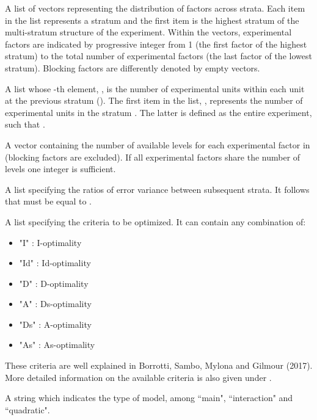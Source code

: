 \documentclass[a4paper]{book}
\begin{document}
\begin{Arguments}
\begin{ldescription}
\item[\code{facts}] A list of vectors representing the distribution of factors
across strata. Each item in the list represents a stratum and the first item
is the highest stratum of the multi-stratum structure of the experiment.
Within the vectors, experimental factors are indicated by progressive integer
from 1 (the first factor of the highest stratum) to the total number of
experimental factors (the last factor of the lowest stratum). Blocking
factors are differently denoted by empty vectors.

\item[\code{units}] A list whose -th element, , is the number of
experimental units within each unit at the previous stratum (). The
first item in the list, , represents the number of experimental
units in the stratum . The latter is defined as the entire experiment,
such that .

\item[\code{levels}] A vector containing the number of available levels for each
experimental factor in  (blocking factors are excluded). If all
experimental factors share the number of levels one integer is sufficient.

\item[\code{etas}] A list specifying the ratios of error variance between subsequent
strata. It follows that  must be equal to
.

\item[\code{criteria}] A list specifying the criteria to be optimized. It can
contain any combination of:
\begin{itemize}

\item{} "I" : I-optimality
\item{} "Id" : Id-optimality
\item{} "D" : D-optimality
\item{} "A" : Ds-optimality
\item{} "Ds" : A-optimality
\item{} "As" : As-optimality

\end{itemize}

These criteria are well explained in Borrotti, Sambo, Mylona and Gilmour (2017).
More detailed information on the available criteria is also given under
.

\item[\code{model}] A string which indicates the type of model, among ``main",
``interaction" and ``quadratic".
\end{ldescription}
\end{Arguments}
\end{document}
